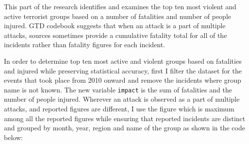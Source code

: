\documentclass[11pt,oneside,a4paper]{reedthesis}
\begin{document}
This part of the research identifies and examines the top ten most
violent and active terrorist groups based on a number of fatalities and
number of people injured. GTD codebook suggests that when an attack is a
part of multiple attacks, sources sometimes provide a cumulative
fatality total for all of the incidents rather than fatality figures for
each incident.

In order to determine top ten most active and violent groups based on
fatalities and injured while preserving statistical accuracy, first I
filter the dataset for the events that took place from 2010 onward and
remove the incidents where group name is not known. The new variable
\texttt{impact} is the sum of fatalities and the number of people
injured. Wherever an attack is observed as a part of multiple attacks,
and reported figures are different, I use the figure which is maximum
among all the reported figures while ensuring that reported incidents
are distinct and grouped by month, year, region and name of the group as
shown in the code below:
\end{document}
